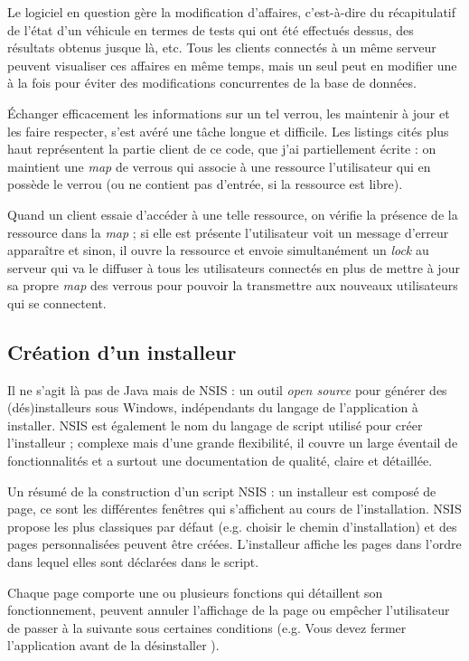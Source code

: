 Le logiciel en question gère la modification d'affaires, c'est-à-dire du récapitulatif de l'état d'un véhicule en termes de tests qui ont été effectués dessus, des résultats obtenus jusque là, etc. Tous les clients connectés à un même serveur peuvent visualiser ces affaires en même temps, mais un seul peut en modifier une à la fois pour éviter des modifications concurrentes de la base de données.

Échanger efficacement les informations sur un tel verrou, les maintenir à jour et les faire respecter, s'est avéré une tâche longue et difficile. Les listings cités plus haut représentent la partie client de ce code, que j'ai partiellement écrite : on maintient une \textit{map} de verrous qui associe à une ressource l'utilisateur qui en possède le verrou (ou ne contient pas d'entrée, si la ressource est libre). 

Quand un client essaie d'accéder à une telle ressource, on vérifie la présence de la ressource dans la \textit{map} ; si elle est présente l'utilisateur voit un message d'erreur apparaître et sinon, il ouvre la ressource et envoie simultanément un \textit{lock} au serveur qui va le diffuser à tous les utilisateurs connectés en plus de mettre à jour sa propre \textit{map} des verrous pour pouvoir la transmettre aux nouveaux utilisateurs qui se connectent. 

\subsection{Création d'un installeur}
Il ne s'agit là pas de Java mais de NSIS\cite{nsis} : un outil \textit{open source} pour générer des (dés)installeurs sous Windows, indépendants du langage de l'application à installer. NSIS est également le nom du langage de script utilisé pour créer l'installeur ; complexe mais d'une grande flexibilité, il couvre un large éventail de fonctionnalités et a surtout une documentation de qualité, claire et détaillée\cite{nsis_doc}. 

Un résumé de la construction d'un script NSIS : un installeur est composé de page, ce sont les différentes fenêtres qui s'affichent au cours de l'installation. NSIS propose les plus classiques par défaut (e.g. choisir le chemin d'installation) et des pages personnalisées peuvent être créées. L'installeur affiche les pages dans l'ordre dans lequel elles sont déclarées dans le script. 

Chaque page comporte une ou plusieurs fonctions qui détaillent son fonctionnement, peuvent annuler l'affichage de la page ou empêcher l'utilisateur de passer à la suivante sous certaines conditions (e.g. \og Vous devez fermer l'application avant de la désinstaller \fg{}).

